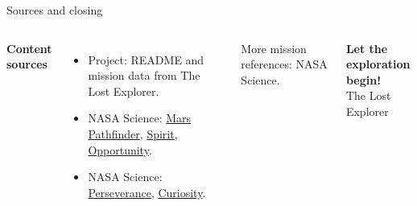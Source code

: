 \documentclass[aspectratio=169,11pt]{beamer}
\newcommand{\tagline}[1]{{\small\color{muted}#1}}
\begin{document}
\begin{frame}{Sources and closing}
  \begin{columns}[T,onlytextwidth]
      \textbf{\color{cyan}Content sources}
      \begin{itemize}
        \item Project: README and mission data from The Lost Explorer.
        \item NASA Science: \href{https://science.nasa.gov/mission/mars-pathfinder/}{Mars Pathfinder},
          \href{https://science.nasa.gov/mission/mer-spirit/}{Spirit},
          \href{https://science.nasa.gov/mission/mer-opportunity/}{Opportunity}.
        \item NASA Science: \href{https://science.nasa.gov/mission/mars-2020-perseverance/}{Perseverance},
          \href{https://science.nasa.gov/mission/msl-curiosity/}{Curiosity}.
      \end{itemize}
      \vspace{0.15cm}
      \tagline{More mission references: NASA Science.}
      \vspace{0.35cm}

      {\Large\bfseries Let the exploration begin!}\\[0.15cm]
      \tagline{The Lost Explorer}
  \end{columns}
\end{frame}
\end{document}
